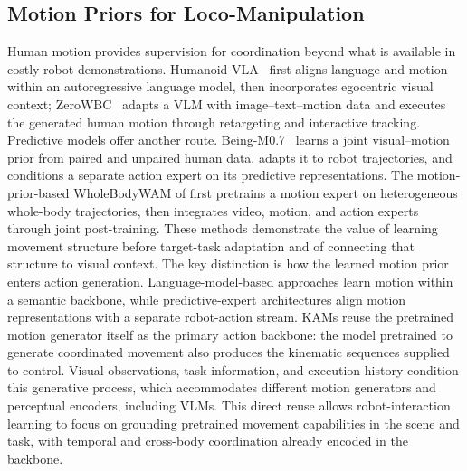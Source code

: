 \subsection{Motion Priors for Loco-Manipulation}
\label{sec:related_motion_priors}
Human motion provides supervision for coordination beyond what is available in costly robot demonstrations. Humanoid-VLA~\citep{humanoidvla} first aligns language and motion within an autoregressive language model, then incorporates egocentric visual context; ZeroWBC~\citep{zerowbc} adapts a VLM with image--text--motion data and executes the generated human motion through retargeting and interactive tracking. Predictive models offer another route. Being-M0.7~\citep{beingm07} learns a joint visual--motion prior from paired and unpaired human data, adapts it to robot trajectories, and conditions a separate action expert on its predictive representations. The motion-prior-based WholeBodyWAM of \citet{wholebodywam_motionpriors} first pretrains a motion expert on heterogeneous whole-body trajectories, then integrates video, motion, and action experts through joint post-training. These methods demonstrate the value of learning movement structure before target-task adaptation and of connecting that structure to visual context. The key distinction is how the learned motion prior enters action generation. Language-model-based approaches learn motion within a semantic backbone, while predictive-expert architectures align motion representations with a separate robot-action stream. KAMs reuse the pretrained motion generator itself as the primary action backbone: the model pretrained to generate coordinated movement also produces the kinematic sequences supplied to control. Visual observations, task information, and execution history condition this generative process, which accommodates different motion generators and perceptual encoders, including VLMs. This direct reuse allows robot-interaction learning to focus on grounding pretrained movement capabilities in the scene and task, with temporal and cross-body coordination already encoded in the backbone.

